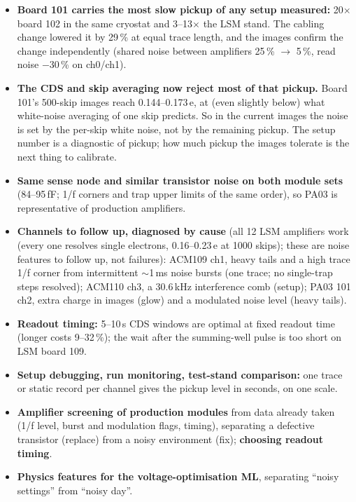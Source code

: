 \documentclass[10pt]{article}
\newcommand{\head}[1]{\par\smallskip{\color{acc}\large\bfseries #1}\par\vspace{1pt}}
\begin{document}
\begin{itemize}
\item \textbf{Board 101 carries the most slow pickup of any setup measured:} 20$\times$ board 102 in the same cryostat and
  3--13$\times$ the LSM stand. The cabling change lowered it by 29\,\% at equal trace length, and the images confirm the
  change independently (shared noise between amplifiers 25\,\% $\to$ 5\,\%, read noise $-30$\,\% on ch0/ch1).
\item \textbf{The CDS and skip averaging now reject most of that pickup.} Board 101's 500-skip images reach
  0.144--0.173\,e, at (even slightly below) what white-noise averaging of one skip predicts. So in the current
  images the noise is set by the per-skip white noise, not by the remaining pickup. The setup number is a diagnostic of
  pickup; how much pickup the images tolerate is the next thing to calibrate.
\item \textbf{Same sense node and similar transistor noise on both module sets} (84--95\,fF; 1/f corners and trap
  upper limits of the same order), so PA03 is representative of production amplifiers.
\item \textbf{Channels to follow up, diagnosed by cause} (all 12 LSM amplifiers work (every one resolves single electrons, 0.16--0.23\,e at 1000 skips); these are noise features to follow up, not failures): ACM109 ch1, heavy tails and a high trace 1/f corner
  from intermittent $\sim$1\,ms noise bursts (one trace; no single-trap steps resolved); ACM110 ch3, a 30.6\,kHz interference comb (setup);
  PA03 101 ch2, extra charge in images (glow) and a modulated noise level (heavy tails).
\item \textbf{Readout timing:} 5--10\,\textmu s CDS windows are optimal at fixed readout time (longer costs
  9--32\,\%); the wait after the summing-well pulse is too short on LSM board 109.
\end{itemize}

\head{What it can be used for}
\begin{itemize}
\item \textbf{Setup debugging, run monitoring, test-stand comparison:} one trace or static record per channel gives
  the pickup level in seconds, on one scale.
\item \textbf{Amplifier screening of production modules} from data already taken (1/f level, burst and modulation flags, timing),
  separating a defective transistor (replace) from a noisy environment (fix); \textbf{choosing readout timing}.
\item \textbf{Physics features for the voltage-optimisation ML}, separating ``noisy settings'' from ``noisy day''.
\end{itemize}
\end{document}
